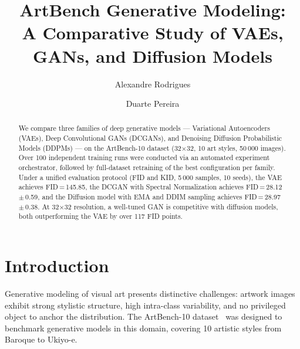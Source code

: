 \documentclass[runningheads]{llncs}
\begin{document}
\title{ArtBench Generative Modeling:\texorpdfstring{\\}{ }A Comparative Study of VAEs, GANs, and Diffusion Models}

\author{Alexandre Rodrigues \and
Duarte Pereira}



\maketitle

\begin{abstract}
We compare three families of deep generative models --- Variational Autoencoders (VAEs), Deep Convolutional GANs (DCGANs), and Denoising Diffusion Probabilistic Models (DDPMs) --- on the ArtBench-10 dataset (32$\times$32, 10 art styles, 50\,000 images). Over 100 independent training runs were conducted via an automated experiment orchestrator, followed by full-dataset retraining of the best configuration per family. Under a unified evaluation protocol (FID and KID, 5\,000 samples, 10 seeds), the VAE achieves FID\,=\,145.85, the DCGAN with Spectral Normalization achieves FID\,=\,28.12\,$\pm$\,0.59, and the Diffusion model with EMA and DDIM sampling achieves FID\,=\,28.97\,$\pm$\,0.38. At 32$\times$32 resolution, a well-tuned GAN is competitive with diffusion models, both outperforming the VAE by over 117 FID points.
\end{abstract}

\section{Introduction}\label{sec:intro}

Generative modeling of visual art presents distinctive challenges: artwork images exhibit strong stylistic structure, high intra-class variability, and no privileged object to anchor the distribution. The ArtBench-10 dataset~\cite{liao2022} was designed to benchmark generative models in this domain, covering 10 artistic styles from Baroque to Ukiyo-e.
\end{document}
